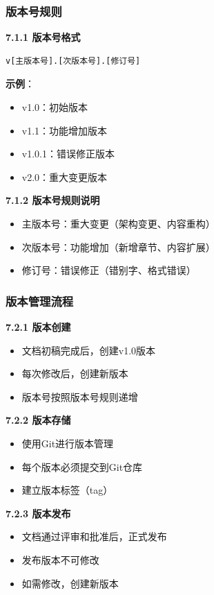 \documentclass[12pt,a4paper]{article}
\numberwithin{equation}{section}  %
\begin{document}
\subsubsection{版本号规则}
\textbf{7.1.1 版本号格式}
\begin{verbatim}
v[主版本号].[次版本号].[修订号]
\end{verbatim}

\textbf{示例}：
\begin{itemize}
\item v1.0：初始版本
\item v1.1：功能增加版本
\item v1.0.1：错误修正版本
\item v2.0：重大变更版本
\end{itemize}

\textbf{7.1.2 版本号规则说明}
\begin{itemize}
\item 主版本号：重大变更（架构变更、内容重构）
\item 次版本号：功能增加（新增章节、内容扩展）
\item 修订号：错误修正（错别字、格式错误）
\end{itemize}

\subsubsection{版本管理流程}
\textbf{7.2.1 版本创建}
\begin{itemize}
\item 文档初稿完成后，创建v1.0版本
\item 每次修改后，创建新版本
\item 版本号按照版本号规则递增
\end{itemize}

\textbf{7.2.2 版本存储}
\begin{itemize}
\item 使用Git进行版本管理
\item 每个版本必须提交到Git仓库
\item 建立版本标签（tag）
\end{itemize}

\textbf{7.2.3 版本发布}
\begin{itemize}
\item 文档通过评审和批准后，正式发布
\item 发布版本不可修改
\item 如需修改，创建新版本
\end{itemize}
\end{document}

